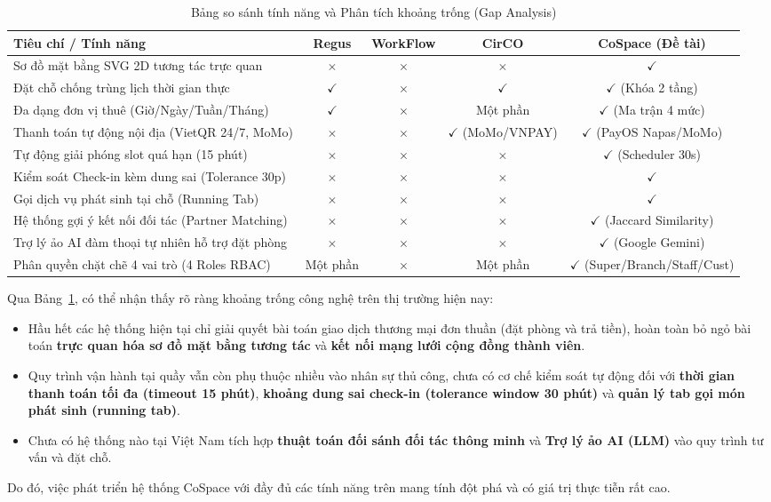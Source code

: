 \begin{table}[H]
\centering
\caption{Bảng so sánh tính năng và Phân tích khoảng trống (Gap Analysis)}
\label{tab:gap-analysis}
\renewcommand{\arraystretch}{1.3}
\begin{tabular}{|p{5.5cm}|c|c|c|c|}
\hline
\textbf{Tiêu chí / Tính năng} & \textbf{Regus} & \textbf{WorkFlow} & \textbf{CirCO} & \textbf{CoSpace (Đề tài)} \\
\hline
Sơ đồ mặt bằng SVG 2D tương tác trực quan & $\times$ & $\times$ & $\times$ & $\checkmark$ \\
\hline
Đặt chỗ chống trùng lịch thời gian thực & $\checkmark$ & $\times$ & $\checkmark$ & $\checkmark$ (Khóa 2 tầng) \\
\hline
Đa dạng đơn vị thuê (Giờ/Ngày/Tuần/Tháng) & $\checkmark$ & $\times$ & Một phần & $\checkmark$ (Ma trận 4 mức) \\
\hline
Thanh toán tự động nội địa (VietQR 24/7, MoMo) & $\times$ & $\times$ & $\checkmark$ (MoMo/VNPAY) & $\checkmark$ (PayOS Napas/MoMo) \\
\hline
Tự động giải phóng slot quá hạn (15 phút) & $\times$ & $\times$ & $\times$ & $\checkmark$ (Scheduler 30s) \\
\hline
Kiểm soát Check-in kèm dung sai (Tolerance 30p) & $\times$ & $\times$ & $\times$ & $\checkmark$ \\
\hline
Gọi dịch vụ phát sinh tại chỗ (Running Tab) & $\times$ & $\times$ & $\times$ & $\checkmark$ \\
\hline
Hệ thống gợi ý kết nối đối tác (Partner Matching) & $\times$ & $\times$ & $\times$ & $\checkmark$ (Jaccard Similarity) \\
\hline
Trợ lý ảo AI đàm thoại tự nhiên hỗ trợ đặt phòng & $\times$ & $\times$ & $\times$ & $\checkmark$ (Google Gemini) \\
\hline
Phân quyền chặt chẽ 4 vai trò (4 Roles RBAC) & Một phần & $\times$ & Một phần & $\checkmark$ (Super/Branch/Staff/Cust) \\
\hline
\end{tabular}
\end{table}

Qua Bảng~\ref{tab:gap-analysis}, có thể nhận thấy rõ ràng khoảng trống công nghệ trên thị trường hiện nay:
\begin{itemize}
    \item Hầu hết các hệ thống hiện tại chỉ giải quyết bài toán giao dịch thương mại đơn thuần (đặt phòng và trả tiền), hoàn toàn bỏ ngỏ bài toán \textbf{trực quan hóa sơ đồ mặt bằng tương tác} và \textbf{kết nối mạng lưới cộng đồng thành viên}.
    \item Quy trình vận hành tại quầy vẫn còn phụ thuộc nhiều vào nhân sự thủ công, chưa có cơ chế kiểm soát tự động đối với \textbf{thời gian thanh toán tối đa (timeout 15 phút)}, \textbf{khoảng dung sai check-in (tolerance window 30 phút)} và \textbf{quản lý tab gọi món phát sinh (running tab)}.
    \item Chưa có hệ thống nào tại Việt Nam tích hợp \textbf{thuật toán đối sánh đối tác thông minh} và \textbf{Trợ lý ảo AI (LLM)} vào quy trình tư vấn và đặt chỗ.
\end{itemize}
Do đó, việc phát triển hệ thống CoSpace với đầy đủ các tính năng trên mang tính đột phá và có giá trị thực tiễn rất cao.

